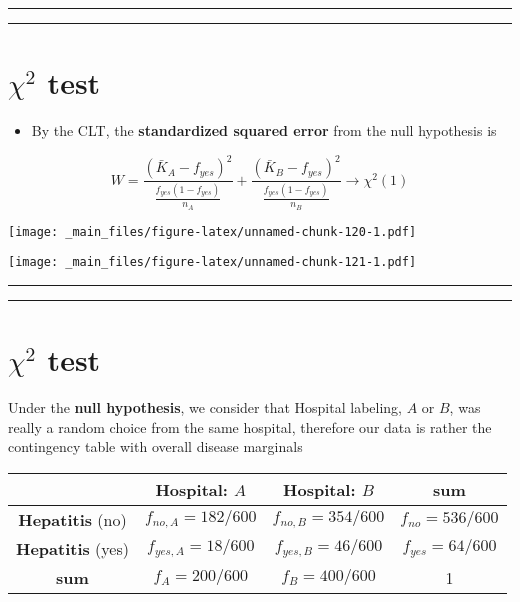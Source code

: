 \documentclass[
]{book}
\providecommand{\tightlist}{%
  \setlength{\itemsep}{0pt}\setlength{\parskip}{0pt}}
\begin{document}
\begin{center}\rule{0.5\linewidth}{0.5pt}\end{center}

\begin{center}\rule{0.5\linewidth}{0.5pt}\end{center}

\hypertarget{chi2-test}{%
\section{\texorpdfstring{\(\chi^2\) test}{\textbackslash chi\^{}2 test}}\label{chi2-test}}

\begin{itemize}
\tightlist
\item
  By the CLT, the \textbf{standardized squared error} from the null hypothesis is
\end{itemize}

\[W= \frac{(\bar{K}_A-f_{yes})^2}{\frac{f_{yes}(1-f_{yes})}{n_A}} + \frac{(\bar{K}_B-f_{yes})^2}{\frac{f_{yes}(1-f_{yes})}{n_B}}\rightarrow \chi^2(1)\]

\texttt{[image: \_main\_files/figure-latex/unnamed-chunk-120-1.pdf]}

\texttt{[image: \_main\_files/figure-latex/unnamed-chunk-121-1.pdf]}

\begin{center}\rule{0.5\linewidth}{0.5pt}\end{center}

\begin{center}\rule{0.5\linewidth}{0.5pt}\end{center}

\hypertarget{chi2-test-1}{%
\section{\texorpdfstring{\(\chi^2\) test}{\textbackslash chi\^{}2 test}}\label{chi2-test-1}}

Under the \textbf{null hypothesis}, we consider that Hospital labeling, \(A\) or \(B\), was really a random choice from the same hospital, therefore our data is rather the contingency table with overall disease marginals

\begin{longtable}[]{@{}cccc@{}}
\toprule
& Hospital: \(A\) & Hospital: \(B\) & sum \\
\midrule
\endhead
\textbf{Hepatitis} (no) & \(f_{no,A}=182/600\) & \(f_{no,B}=354/600\) & \(f_{no}=536/600\) \\
\textbf{Hepatitis} (yes) & \(f_{yes,A}=18/600\) & \(f_{yes,B}=46/600\) & \(f_{yes}=64/600\) \\
\textbf{sum} & \(f_{A}=200/600\) & \(f_{B}=400/600\) & 1 \\
\bottomrule
\end{longtable}
\end{document}
